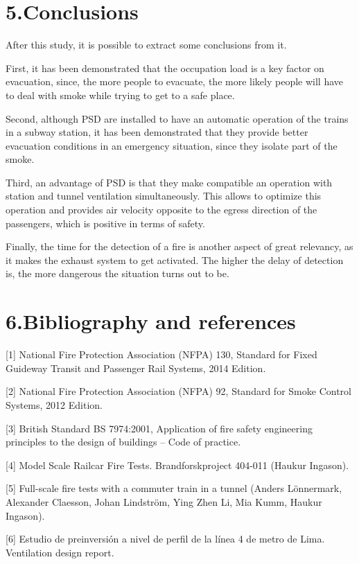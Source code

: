 \documentclass{article}
\begin{document}
\section{5.\hspace*{0.5em}Conclusions}\label{sec-conclusions}%

\noindent{}After this study, it is possible to extract some conclusions from it.%

First, it has been demonstrated that the occupation load is a key factor on 
evacuation, since, the more people to evacuate, the more likely people will have 
to deal with smoke while trying to get to a safe place.%

Second, although PSD are installed to have an automatic operation of the trains in a 
subway station, it has been demonstrated that they provide better evacuation 
conditions in an emergency situation, since they isolate part of the smoke.%

Third, an advantage of PSD is that they make compatible an operation with station 
and tunnel ventilation simultaneously. This allows to optimize this operation and 
provides air velocity opposite to the egress direction of the passengers, which is 
positive in terms of safety.%

Finally, the time for the detection of a fire is another aspect of great relevancy, 
as it makes the exhaust system to get activated. The higher the delay of detection 
is, the more dangerous the situation turns out to be.%

\section{6.\hspace*{0.5em}Bibliography and references}\label{sec-bibliography-and-references}%

\noindent{}[1] National Fire Protection Association (NFPA) 130, Standard for Fixed Guideway Transit 
and Passenger Rail Systems, 2014 Edition.%

[2] National Fire Protection Association (NFPA) 92, Standard for Smoke Control Systems, 
2012 Edition.%

[3] British Standard BS 7974:2001, Application of fire safety engineering principles 
to the design of buildings – Code of practice.%

[4] Model Scale Railcar Fire Tests. Brandforskproject 404-011 (Haukur Ingason).%

[5] Full-scale fire tests with a commuter train in a tunnel (Anders Lönnermark, 
Alexander Claesson, Johan Lindström, Ying Zhen Li, Mia Kumm, Haukur Ingason).%

[6] Estudio de preinversión a nivel de perfil de la línea 4 de metro de Lima. 
Ventilation design report.%
\end{document}

